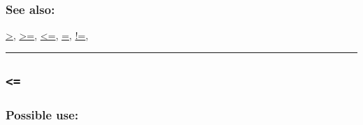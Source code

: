 \documentclass[]{book}
\theoremstyle{definition}
\theoremstyle{definition}
\theoremstyle{definition}
\theoremstyle{remark}
\begin{document}
\subsubsection{See also:}\label{see-also-9}

\href{operators-a-to-a.html\#\%3E}{\textgreater{}},
\href{operators-a-to-a.html\#\%3E=}{\textgreater{}=},
\href{operators-a-to-a.html\#\%3C=}{\textless{}=},
\href{operators-a-to-a.html\#=}{=},
\href{operators-a-to-a.html\#!=}{!=},

\begin{center}\rule{0.5\linewidth}{\linethickness}\end{center}

\subsection{\texorpdfstring{\texttt{\textless{}=}}{\textless{}=}}\label{section-14}

\subsubsection{Possible use:}\label{possible-use-12}
\end{document}
